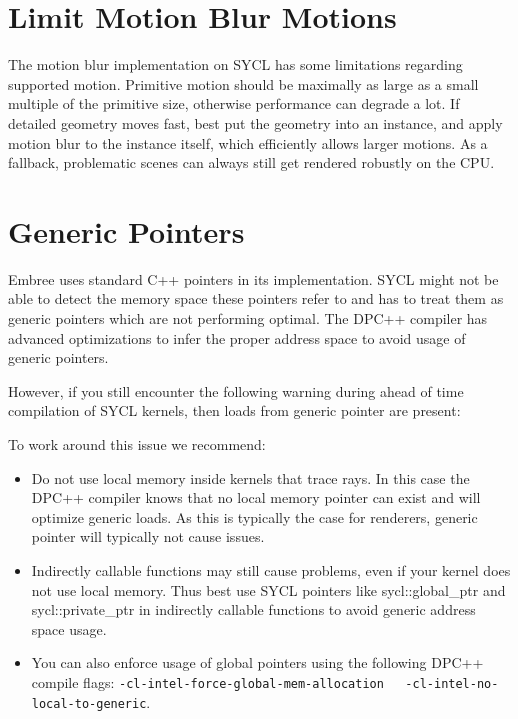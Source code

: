 \section{Limit Motion Blur Motions}\label{limit-motion-blur-motions}

The motion blur implementation on SYCL has some limitations regarding
supported motion. Primitive motion should be maximally as large as a
small multiple of the primitive size, otherwise performance can degrade
a lot. If detailed geometry moves fast, best put the geometry into an
instance, and apply motion blur to the instance itself, which
efficiently allows larger motions. As a fallback, problematic scenes can
always still get rendered robustly on the CPU.

\section{Generic Pointers}\label{generic-pointers}

Embree uses standard C++ pointers in its implementation. SYCL might not
be able to detect the memory space these pointers refer to and has to
treat them as generic pointers which are not performing optimal. The
DPC++ compiler has advanced optimizations to infer the proper address
space to avoid usage of generic pointers.

However, if you still encounter the following warning during ahead of
time compilation of SYCL kernels, then loads from generic pointer are
present:

\begin{Shaded}
\begin{Highlighting}[]
\OperatorTok{:}
\end{Highlighting}
\end{Shaded}

To work around this issue we recommend:

\begin{itemize}
\item
  Do not use local memory inside kernels that trace rays. In this case
  the DPC++ compiler knows that no local memory pointer can exist and
  will optimize generic loads. As this is typically the case for
  renderers, generic pointer will typically not cause issues.
\item
  Indirectly callable functions may still cause problems, even if your
  kernel does not use local memory. Thus best use SYCL pointers like
  sycl::global\_ptr and sycl::private\_ptr in indirectly callable
  functions to avoid generic address space usage.
\item
  You can also enforce usage of global pointers using the following
  DPC++ compile flags:
  \texttt{-cl-intel-force-global-mem-allocation\ \ \ -cl-intel-no-local-to-generic}.
\end{itemize}

